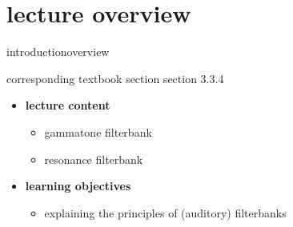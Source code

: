 


\subtitle{Module 3.3.4: Time-Frequency Representations~---~Filterbanks}


	

    \section[overview]{lecture overview}
        \begin{frame}{introduction}{overview}
            \begin{block}{corresponding textbook section}
                    section 3.3.4
            \end{block}

            \begin{itemize}
                \item   \textbf{lecture content}
                    \begin{itemize}
                        \item   gammatone filterbank
                        \item   resonance filterbank
                    \end{itemize}
                \bigskip
                \item<2->   \textbf{learning objectives}
                    \begin{itemize}
                        \item   explaining the principles of (auditory) filterbanks
                    \end{itemize}
            \end{itemize}
        \end{frame}
        
